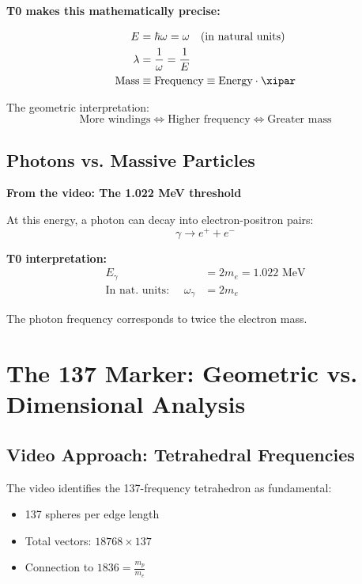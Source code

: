 	\begin{vorteil}
		\textbf{T0 makes this mathematically precise:}
		
		\begin{align}
			E &= \hbar \omega = \omega \quad \text{(in natural units)} \\
			\lambda &= \frac{1}{\omega} = \frac{1}{E} \\
			\text{Mass} &\equiv \text{Frequency} \equiv \text{Energy} \cdot \xipar
		\end{align}
		
		The geometric interpretation:
		\begin{equation}
			\boxed{\text{More windings} \Leftrightarrow \text{Higher frequency} \Leftrightarrow \text{Greater mass}}
		\end{equation}
	\end{vorteil}
	
	\subsection{Photons vs. Massive Particles}
	
	\textbf{From the video: The 1.022 MeV threshold}
	
	At this energy, a photon can decay into electron-positron pairs:
	\begin{equation}
		\gamma \rightarrow e^+ + e^-
	\end{equation}
	
	\textbf{T0 interpretation:}
	\begin{align}
		E_\gamma &= 2 m_e = 1.022 \text{ MeV} \\
		\text{In nat. units: } \quad \omega_\gamma &= 2 m_e
	\end{align}
	
	The photon frequency corresponds to twice the electron mass.
	
	\section{The 137 Marker: Geometric vs. Dimensional Analysis}
	
	\subsection{Video Approach: Tetrahedral Frequencies}
	
	The video identifies the 137-frequency tetrahedron as fundamental:
	\begin{itemize}
		\item 137 spheres per edge length
		\item Total vectors: $18768 \times 137$
		\item Connection to $1836 = \frac{m_p}{m_e}$
	\end{itemize}
	
